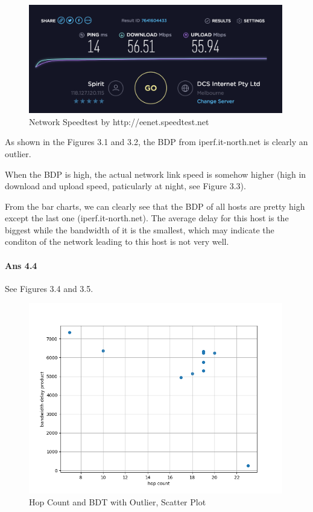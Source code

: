 \documentclass[paper=a4, fontsize=10pt]{scrartcl} %
\numberwithin{equation}{section} %
\numberwithin{figure}{section} %
\numberwithin{table}{section} %
\begin{document}
\begin{figure}[htbp!]
    \centering
    \includegraphics[width=0.99\textwidth]{43.png}
    \caption{Network Speedtest by http://eenet.speedtest.net }%
    \vspace{-1em}
\end{figure}
As shown in the Figures 3.1 and 3.2, the BDP from iperf.it-north.net is clearly an outlier.

When the BDP is high, the actual network link speed is somehow higher (high in download and upload speed, paticularly at night, see Figure 3.3). 

From the bar charts, we can clearly see that the BDP of all hosts are pretty high except the last one (iperf.it-north.net). The average delay for this host is the biggest while the bandwidth of it is the smallest, which may indicate the conditon of the network leading to this host is not very well.

\paragraph{Ans 4.4}
See Figures 3.4 and 3.5.
\begin{figure}[htbp!]
    \centering
    \includegraphics[width=0.99\textwidth]{hop_vs_bdp.png}
    \caption{Hop Count and BDT with Outlier, Scatter Plot}%
    \vspace{-1em}
\end{figure}
\end{document}
